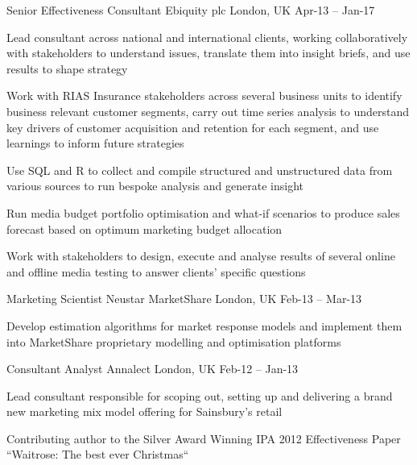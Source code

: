 \begin{cventries}
  \cventry
    {Senior Effectiveness Consultant} %
    {Ebiquity plc} %
    {London, UK} %
    {Apr-13 – Jan-17} %
    {
      \begin{cvitems} %
        \item {Lead consultant across national and international clients, working collaboratively with stakeholders to understand issues, translate them into insight briefs, and use results to shape strategy}
        \item {Work with RIAS Insurance stakeholders across several business units to identify business relevant customer segments, carry out time series analysis to understand key drivers of customer acquisition and retention for each segment, and use learnings to inform future strategies}
        \item {Use SQL and R to collect and compile structured and unstructured data from various sources to run bespoke analysis and generate insight}
        \item {Run media budget portfolio optimisation and what-if scenarios to produce sales forecast based on optimum marketing budget allocation}
        \item {Work with stakeholders to design, execute and analyse results of several online and offline media testing to answer clients’ specific questions}
      \end{cvitems}
    }

  \cventry
    {Marketing Scientist} %
    {Neustar MarketShare} %
    {London, UK} %
    {Feb-13 – Mar-13} %
    {
      \begin{cvitems} %
        \item {Develop estimation algorithms for market response models and implement them into MarketShare proprietary modelling and optimisation platforms}
      \end{cvitems}
      }
    
  \cventry
    {Consultant Analyst} %
    {Annalect} %
    {London, UK} %
    {Feb-12 – Jan-13} %
    {
      \begin{cvitems} %
        \item {Lead consultant responsible for scoping out, setting up and delivering a brand new marketing mix model offering for Sainsbury’s retail}
        \item {Contributing author to the Silver Award Winning IPA 2012 Effectiveness Paper “Waitrose: The best ever Christmas“}
      \end{cvitems}
    }
    

\end{cventries}
